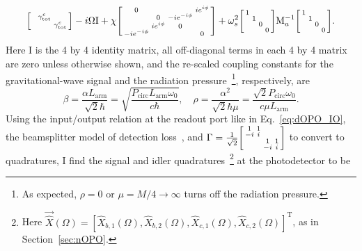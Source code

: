 \begin{align}
\begin{bsmallmatrix}
 &  & \gamma^c_\mathrm{tot} &  \\
 &  &  & \gamma^c_\mathrm{tot} 
\end{bsmallmatrix}-i\Omega \text{I}+\chi \begin{bsmallmatrix}
0 &  &  & i e^{i\phi} \\
 & 0 & -i e^{-i\phi} &  \\
 & i e^{i\phi} & 0 &  \\
-i e^{-i\phi} &  &  & 0
\end{bsmallmatrix}+\omega_s^2\begin{bsmallmatrix}
1 &  &  &  \\
 & 1 &  &  \\
 &  & 0 &  \\
 &  &  & 0
\end{bsmallmatrix}\text{M}_a^{-1}\begin{bsmallmatrix}
1 &  &  &  \\
 & 1 &  &  \\
 &  & 0 &  \\
 &  &  & 0
\end{bsmallmatrix}.
\end{align}
Here $\text{I}$ is the 4 by 4 identity matrix, all off-diagonal terms in each 4 by 4 matrix are zero unless otherwise shown, and the re-scaled coupling constants for the gravitational-wave signal and the radiation pressure~\footnote{As expected, $\rho=0$ or $\mu=M/4\rightarrow\infty$ turns off the radiation pressure.}, respectively, are
\begin{equation}\label{eq:beta_and_rho}
\beta = \frac{\alpha L_\mathrm{arm}}{\sqrt{2}\hbar}=\sqrt{\frac{ P_\text{circ}L_\text{arm} \omega_0 }{c  \hbar}},\quad \rho = \frac{\alpha^2}{\sqrt{2}\hbar\mu}=\frac{\sqrt{2} P_\text{circ} \omega_0}{c \mu L_\text{arm}}.
\end{equation}
Using the input/output relation at the readout port like in Eq.~\ref{eq:dOPO_IO}, the beamsplitter model of detection loss~\cite{}, and $\Gamma= \frac{1}{\sqrt2}\begin{bsmallmatrix}
1 & 1 &  &  \\
-i & i &  &  \\
 &  & 1 & 1 \\
 &  & -i & i
\end{bsmallmatrix}$ to convert to quadratures, I find the signal and idler quadratures~\footnote{Here $\vec{\hat X}(\Omega)=[\hat X_{b,1}(\Omega),\hat X_{b,2}(\Omega),\hat X_{c,1}(\Omega),\hat X_{c,2}(\Omega)]^\text{T}$, as in Section~\ref{sec:nOPO}.} at the photodetector to be
